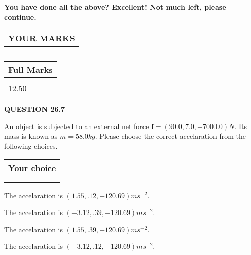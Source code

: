 \documentclass[12pt]{article}
\begin{document}
  
 
   
   
\vspace{0.3in}
{\textbf{\LARGE{You have done all the above? Excellent! Not much left, please continue.}}}
\vspace{0.3in}
   
   
  
\vspace{0.2in}
  
\noindent\begin{tabular}{|l|}
\hline
 YOUR MARKS  \\
\hline
 \\ 
 \\ 
\hline
\end{tabular}
\hspace{0.05in} \begin{tabular}{|l|}
\hline
 Full Marks  \\
\hline
 \\ 
12.50 \\
\hline
\end{tabular}
{\textbf{\Large{QUESTION
26.7 
}}}
  
  
 
An object is subjected to an external net force $\mathbf{f}=
(90.0 , 7.0 , -7000.0) N$.
Its mass is known as $m= %
58.0 kg$.
Please choose the correct accelaration from the following choices.
  
  
\noindent\hspace{3.0in} \begin{tabular}{|l|}
\hline
Your choice \\
\hline
 \\ 
 \\ 
\hline
\end{tabular}
  
  
 
 
  The accelaration is $  %
(
1.55,
.12,
-120.69)
ms^{-2} $.
 
 
  The accelaration is $  %
(
-3.12,
.39,
-120.69)
ms^{-2} $.
 
 
  The accelaration is $  %
(
1.55,
.39,
-120.69)
ms^{-2} $.
 
 
  The accelaration is $  %
(
-3.12,
.12,
-120.69)
ms^{-2} $.
 
 
 

 
 
\vspace{0.3in}
  
\end{document}
